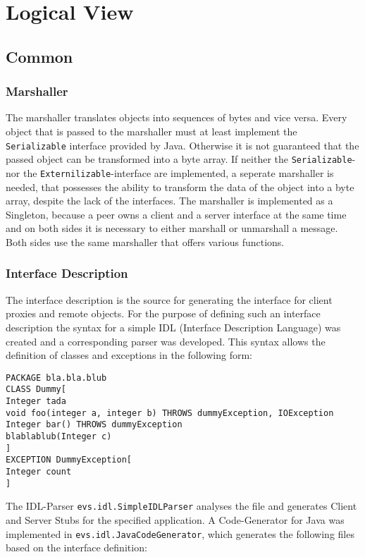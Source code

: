 \section{Logical View}

\cite{zdun2008}

\subsection{Common}
\subsubsection{Marshaller}
The marshaller translates objects into sequences of bytes and vice versa. Every object that is passed to the marshaller must at least implement the \texttt{Serializable} interface provided by Java. Otherwise it is not guaranteed that the passed object can be transformed into a byte array. If neither the \texttt{Serializable}- nor the \texttt{Externilizable}-interface are implemented, a seperate marshaller is needed, that possesses the ability to transform the data of the object into a byte array, despite the lack of the interfaces. The marshaller is implemented as a Singleton, because a peer owns a client and a server interface at the same time and on both sides it is necessary to either marshall or unmarshall a message. Both sides use the same marshaller that offers various functions.

\subsubsection{Interface Description}
The interface description is the source for generating the interface for client proxies and remote objects. For the purpose of defining such an interface description the syntax for a simple IDL (Interface Description Language) was created and a corresponding parser was developed. This syntax allows the definition of classes and exceptions in the following form:

\begin{code}
\begin{verbatim}
PACKAGE bla.bla.blub
CLASS Dummy[
Integer tada
void foo(integer a, integer b) THROWS dummyException, IOException
Integer bar() THROWS dummyException
blablablub(Integer c)
]
EXCEPTION DummyException[
Integer count
]
\end{verbatim}
\end{code}

The IDL-Parser \texttt{evs.idl.SimpleIDLParser} analyses the file and generates Client and Server Stubs for the specified application. A Code-Generator for Java was implemented in \texttt{evs.idl.JavaCodeGenerator}, which generates the following files based on the interface definition:

